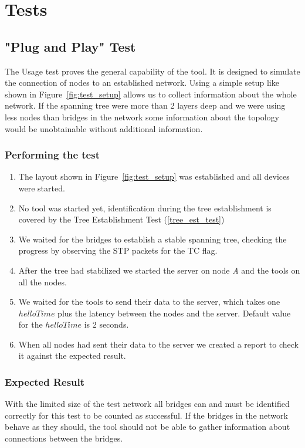 \section{Tests}
\subsection*{"Plug and Play" Test}
\label{usage_test}
The Usage test proves the general capability of the tool.
It is designed to simulate the connection of nodes to an established network.
Using a simple setup like shown in Figure~\ref{fig:test_setup} allows us to collect information about the whole network.
If the spanning tree were more than 2 layers deep and we were using less nodes than bridges in the network some information about the topology would be unobtainable without additional information.

\subsubsection*{Performing the test}
\begin{enumerate}
    \item The layout shown in Figure~\ref{fig:test_setup} was established and all devices were started.
    \item No tool was started yet, identification during the tree establishment is covered by the Tree Establishment Test (\ref{tree_est_test})
    \item We waited for the bridges to establish a stable spanning tree, checking the progress by observing the STP packets for the TC flag.
    \item After the tree had stabilized we started the server on node \textit{A} and the tools on all the nodes.
    \item We waited for the tools to send their data to the server, which takes one $helloTime$ plus the latency between the nodes and the server. Default value for the $helloTime$ is 2 seconds.
    \item When all nodes had sent their data to the server we created a report to check it against the expected result.
\end{enumerate}
\subsubsection*{Expected Result}
With the limited size of the test network all bridges can and must be identified correctly for this test to be counted as successful.
If the bridges in the network behave as they should, the tool should not be able to gather information about connections between the bridges.


